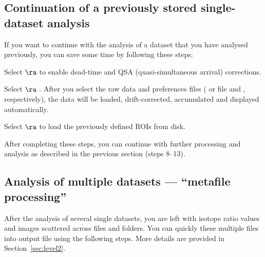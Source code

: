 \subsection{Continuation of a previously stored single-dataset analysis}
\setcounter{step}{0}

If you want to continue with the analysis of a dataset that you have analysed previously, you can save some time by following these steps:

\s Select  $\ra$  to enable dead-time and QSA (quasi-simultaneous arrival) corrections.

\s Select  $\ra$ . After you select the raw data and preferences files ( or  file and , respectively), the data will be loaded, drift-corrected, accumulated and displayed automatically.


 
\s Select  $\ra$  to load the previously defined ROIs from disk.



\bul After completing these steps, you can continue with further processing and analysis as described in the previous section (steps 8--13).


\subsection{Analysis of multiple datasets --- ``metafile processing''}
\setcounter{step}{0}

After the analysis of several single datasets, you are left with isotope ratio values and images scattered across  files and folders. You can quickly  these multiple files into  output file using the following steps. More details are provided in Section~\ref{sec:level2}.

